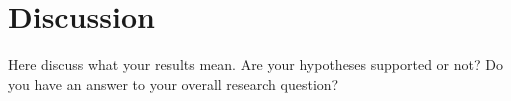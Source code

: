 \section{Discussion}
Here discuss what your results mean. Are your hypotheses supported or not? Do you have an answer to your overall research question?

